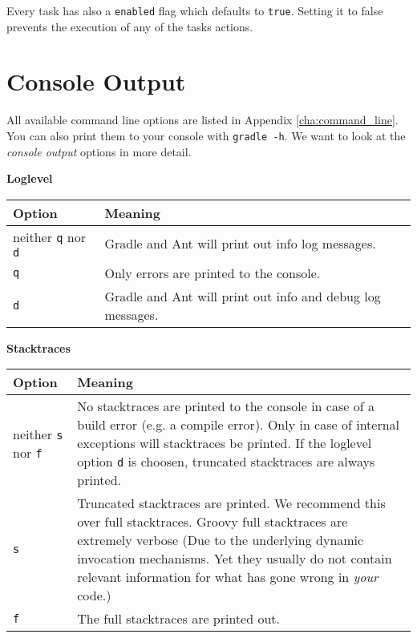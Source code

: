Every task has also a \texttt{enabled} flag which defaults to \texttt{true}. Setting it to false prevents the execution of any of the tasks actions.

\section{Console Output}
All available command line options are listed in Appendix \ref{cha:command_line}. You can also print them to your console with \texttt{gradle -h}. We want to look at the \emph{console output} options in more detail. 
\\

\centerline{\textbf{Loglevel}}
\medskip

\begin{tabular}{|l|l|} \hline
Option & Meaning  \\ \hline
neither \texttt{q} nor \texttt{d} & Gradle and Ant will print out info log messages.  \\ \hline
\texttt{q} & Only errors are printed to the console.  \\ \hline
\texttt{d} & Gradle and Ant will print out info and debug log messages. \\ \hline
\end{tabular}
\medskip

\centerline{\textbf{Stacktraces}}
\medskip

\begin{tabular}{|l|p{15cm}|} \hline
Option & Meaning  \\ \hline
neither \texttt{s} nor \texttt{f} & No stacktraces are printed to the console in case of a build error (e.g. a compile error). Only in case of internal exceptions will stacktraces be printed. If the loglevel option \texttt{d} is choosen, truncated stacktraces are always printed. \\ \hline
\texttt{s} & Truncated stacktraces are printed. We recommend this over full stacktraces. Groovy full stacktraces are extremely verbose (Due to the underlying dynamic invocation mechanisms. Yet they usually do not contain relevant information for what has gone wrong in \emph{your} code.)  \\ \hline
\texttt{f} & The full stacktraces are printed out. \\ \hline
\end{tabular}

